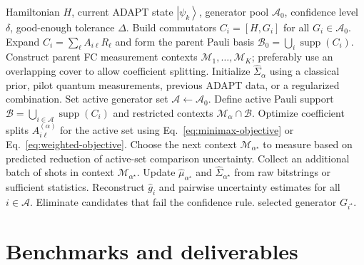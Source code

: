\documentclass[11pt]{article}
\newcommand{\ket}[1]{\left|#1\right\rangle}
\newcommand{\supp}{\operatorname{supp}}
\begin{document}
\begin{algorithm}[h]
\caption{Variance-aware universal operators within grouped BAI}
\begin{algorithmic}[1]
\Require Hamiltonian $H$, current ADAPT state $\ket{\psi_k}$, generator pool $\mathcal A_0$, confidence level $\delta$, good-enough tolerance $\Delta$.
\State Build commutators $C_i=[H,G_i]$ for all $G_i\in\mathcal A_0$.
\State Expand $C_i=\sum_\ell A_{i\ell}R_\ell$ and form the parent Pauli basis $\mathcal B_0=\bigcup_i\supp(C_i)$.
\State Construct parent FC measurement contexts $\mathcal M_1,\ldots,\mathcal M_K$; preferably use an overlapping cover to allow coefficient splitting.
\State Initialize $\widehat\Sigma_\alpha$ using a classical prior, pilot quantum measurements, previous ADAPT data, or a regularized combination.
\State Set active generator set $\mathcal A\leftarrow\mathcal A_0$.
    \State Define active Pauli support $\mathcal B=\bigcup_{i\in\mathcal A}\supp(C_i)$ and restricted contexts $\mathcal M_\alpha\cap\mathcal B$.
    \State Optimize coefficient splits $A^{(\alpha)}_{i\ell}$ for the active set using Eq.~\eqref{eq:minimax-objective} or Eq.~\eqref{eq:weighted-objective}.
    \State Choose the next context $\mathcal M_{\alpha^\star}$ to measure based on predicted reduction of active-set comparison uncertainty.
    \State Collect an additional batch of shots in context $\mathcal M_{\alpha^\star}$.
    \State Update $\widehat\mu_{\alpha^\star}$ and $\widehat\Sigma_{\alpha^\star}$ from raw bitstrings or sufficient statistics.
    \State Reconstruct $\widehat g_i$ and pairwise uncertainty estimates for all $i\in\mathcal A$.
    \State Eliminate candidates that fail the confidence rule.
\EndWhile
\State \Return selected generator $G_{i^\star}$.
\end{algorithmic}
\end{algorithm}

\section{Benchmarks and deliverables}
\end{document}
